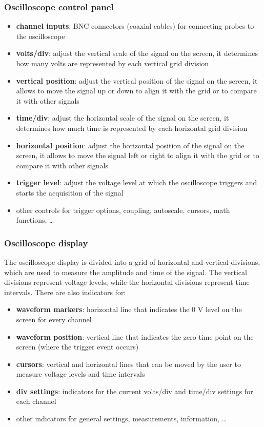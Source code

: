 \subsubsection*{Oscilloscope control panel}
\begin{itemize}
	\item \textbf{channel inputs}: BNC connectors (coaxial cables) for connecting probes to the oscilloscope
	\item \textbf{volts/div}: adjust the vertical scale of the signal on the screen, it determines how many volts are represented
	by each vertical grid division
	\item \textbf{vertical position}: adjust the vertical position of the signal on the screen, it allows to move the signal up
	or down to align it with the grid or to compare it with other signals
	\item \textbf{time/div}: adjust the horizontal scale of the signal on the screen, it determines how much time is represented
	by each horizontal grid division
	\item \textbf{horizontal position}: adjust the horizontal position of the signal on the screen, it allows to move the signal
	left or right to align it with the grid or to compare it with other signals
	\item \textbf{trigger level}: adjust the voltage level at which the oscilloscope triggers and starts the acquisition of the
	signal
	\item other controls for trigger options, coupling, autoscale, cursors, math functions, \dots
\end{itemize}

\subsubsection*{Oscilloscope display}
The oscilloscope display is divided into a grid of horizontal and vertical divisions, which are used to measure the amplitude
and time of the signal. The vertical divisions represent voltage levels, while the horizontal divisions represent time intervals.
There are also indicators for:
\begin{itemize}
	\item \textbf{waveform markers}: horizontal line that indicates the 0 V level on the screen for every channel
	\item \textbf{waveform position}: vertical line that indicates the zero time point on the screen (where the trigger event occurs)
	\item \textbf{cursors}: vertical and horizontal lines that can be moved by the user to measure voltage levels and time intervals
	\item \textbf{div settings}: indicators for the current volts/div and time/div settings for each channel
	\item other indicators for general settings, measurements, information, \dots
\end{itemize}

